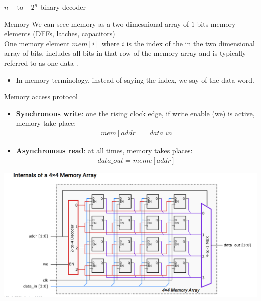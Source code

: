 \begin{parag}{$n-$to $-2^n$ binary decoder}
\begin{framedremark}
\end{framedremark}

\end{parag}



\begin{parag}{Memory}
    We can seee memory as a two dimesnional array of $1$ bits memory elements (DFFs, latches, capacitors)\\
    One memory element $mem\left[i\right]$ where $i$ is the index of the  in the two dimensional array of bits, includes all bits in that row of the memory array and is typically referred to as one data .\\
    \begin{itemize}
        \item In memory terminology, instead of  saying the index, we say  of the data word.
    \end{itemize}
\end{parag}
\begin{parag}{Memory access protocol}
    \begin{itemize}
        \item   \textbf{Synchronous write}: one the rising clock edge, if write enable (we) is active, memory  take place:
            \begin{align*} mem\left[addr\right] =  data\_in \end{align*}
            \item  \textbf{Asynchronous read}: at all times, memory  takes places:
                \begin{align*} data\_out =  meme\left[addr\right] \end{align*}
    \end{itemize}
    
    \begin{center}
        \includegraphics[scale=0.5]{92025-06-20.png}
    \end{center}
\end{parag}





